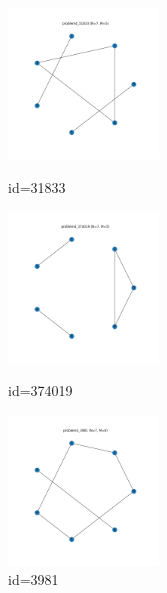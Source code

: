 \documentclass[a4paper, 10pt, dvipdfmx]{jlreq}
\begin{document}
\begin{figure}[htbp]
  \begin{minipage}{0.33\hsize}
    \begin{center}
      \includegraphics[width=40mm]{./img_5/problem4_31833.png}
    \end{center}
    \caption{id=31833}
  \end{minipage}
  \begin{minipage}{0.33\hsize}
    \begin{center}
      \includegraphics[width=40mm]{./img_5/problem4_374019.png}
    \end{center}
    \caption{id=374019}
  \end{minipage}
  \begin{minipage}{0.33\hsize}
    \begin{center}
      \includegraphics[width=40mm]{./img_5/problem4_3981.png}
    \end{center}
    \caption{id=3981}
  \end{minipage}
\end{figure}
\end{document}
